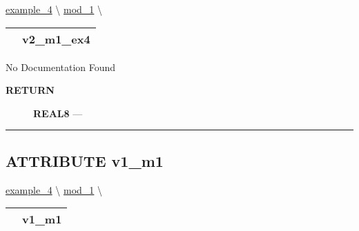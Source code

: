 \hypertarget{ecldoc:intest.inintest.example_4.mod_1.v2_m1_ex4}{}
\hspace{0pt} \hyperlink{ecldoc:intest.inintest.example_4}{example_4} \textbackslash 
\hspace{0pt} \hyperlink{ecldoc:intest.inintest.example_4.mod_1}{mod_1} \textbackslash 

{\renewcommand{\arraystretch}{1.5}
\begin{tabularx}{\textwidth}{|>{\raggedright\arraybackslash}l|X|}
\hline
\hspace{0pt}\mytexttt{\color{red} } & \textbf{v2\_m1\_ex4} \\
\hline
\end{tabularx}
}

\par





No Documentation Found








\par
\begin{description}
\item [\colorbox{tagtype}{\color{white} \textbf{\textsf{RETURN}}}] \textbf{REAL8} --- 
\end{description}




\rule{\linewidth}{0.5pt}
\subsection*{\textsf{\colorbox{headtoc}{\color{white} ATTRIBUTE}
v1\_m1}}

\hypertarget{ecldoc:example_3.mod_1.v1_m1}{}
\hspace{0pt} \hyperlink{ecldoc:intest.inintest.example_4}{example_4} \textbackslash 
\hspace{0pt} \hyperlink{ecldoc:intest.inintest.example_4.mod_1}{mod_1} \textbackslash 

{\renewcommand{\arraystretch}{1.5}
\begin{tabularx}{\textwidth}{|>{\raggedright\arraybackslash}l|X|}
\hline
\hspace{0pt}\mytexttt{\color{red} } & \textbf{v1\_m1} \\
\hline
\end{tabularx}
}

\par





